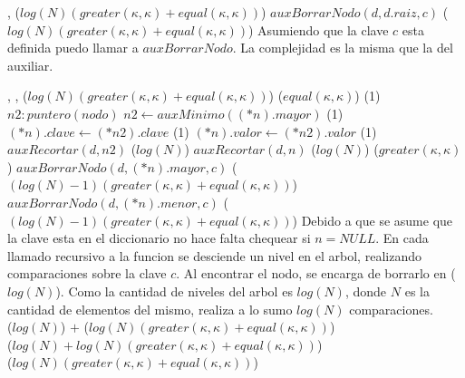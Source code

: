 {   ,
    }
{}
{\bigo($log(N)(greater(\kappa, \kappa)+equal(\kappa, \kappa))$)}
{   \State $auxBorrarNodo(d, d.raiz, c)$                        \comment \bigo($log(N)(greater(\kappa, \kappa)+equal(\kappa, \kappa))$)
}
{   Asumiendo que la clave $c$ esta definida puedo llamar a $auxBorrarNodo$. 
    La complejidad es la misma que la del auxiliar. 
}


{   ,
    ,
    }
{}
{\bigo($log(N)(greater(\kappa, \kappa)+equal(\kappa, \kappa))$)}
{                                                \comment \bigo($equal(\kappa, \kappa)$)
              \comment \bigo(1)
            \var $n2 : puntero(nodo)$ 
            \State $n2 \gets auxMinimo((*n).mayor)$                     \comment \bigo(1)
            \State $(*n).clave \gets (*n2).clave$                       \comment \bigo(1)
            \State $(*n).valor \gets (*n2).valor$                       \comment \bigo(1)
            \State $auxRecortar(d, n2)$                                 \comment \bigo($log(N)$)
        \Else
            \State $auxRecortar(d, n)$                                  \comment \bigo($log(N)$)
        \EndIf
    \Else
                                                 \comment \bigo($greater(\kappa, \kappa)$)
            \State $auxBorrarNodo(d, (*n).mayor, c)$                    \comment \bigo($(log(N)-1)(greater(\kappa, \kappa)+equal(\kappa, \kappa))$)
        \Else
            \State $auxBorrarNodo(d, (*n).menor, c)$                    \comment \bigo($(log(N)-1)(greater(\kappa, \kappa)+equal(\kappa, \kappa))$)
        \EndIf
    \EndIf
}
{   Debido a que se asume que la clave esta en el diccionario no hace falta 
    chequear si $n = NULL$. En cada llamado recursivo a la funcion se desciende
    un nivel en el arbol, realizando comparaciones sobre la clave $c$. Al encontrar el
    nodo, se encarga de borrarlo en \bigo($log(N)$). Como la cantidad de niveles del 
    arbol es $log(N)$, donde $N$ es la cantidad de elementos del mismo, realiza a lo 
    sumo $log(N)$ comparaciones. \\   
    \hspace*{8em} \bigo($log(N)$) $+$ \bigo($log(N)(greater(\kappa, \kappa)+equal(\kappa, \kappa))$) \\
    \hspace*{8em} \bigo($log(N) + log(N)(greater(\kappa, \kappa)+equal(\kappa, \kappa))$) \\
    \hspace*{8em} \bigo($log(N)(greater(\kappa, \kappa)+equal(\kappa, \kappa))$)
}

